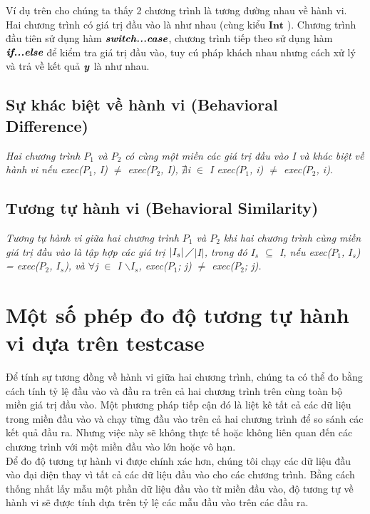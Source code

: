 Ví dụ trên cho chúng ta thấy 2 chương trình là tương đường nhau về hành vi. Hai chương trình có giá trị đầu vào là như nhau (cùng kiểu $\textbf{Int}$ ). Chương trình đầu tiên sử dụng hàm $\textit{\textbf{switch...case}}$, chương trình tiếp theo sử dụng hàm $\textit{\textbf{if...else}}$ để kiểm tra giá trị đầu vào, tuy cú pháp khách nhau nhưng cách xử lý và trả về kết quả $\textbf{\textit{y}}$ là như nhau. 
	
\subsection{Sự khác biệt về hành vi (Behavioral Difference)}
	\textit{Hai chương trình $P_{1}$ và $P_{2}$ có cùng một miền các giá trị đầu vào I và khác biệt về hành vi nếu exec($P_{1}$, I) $\neq$ exec($P_{2}$, I), $\nexists$i $\in$ I exec($P_{1}$, i) $\neq$ exec($P_{2}$, i)}.
	
\subsection{Tương tự hành vi (Behavioral Similarity)}
	\textit{Tương tự hành vi giữa hai chương trình $P_{1}$ và $P_{2}$ khi hai chương trình cùng miền giá trị đầu vào là tập hợp các giá trị $\left|I_{s}\right|\diagup$$\left|I\right|$, trong đó $I_{s}$ $\subseteq $ I, nếu exec($P_{1}$, $I_{s}$) = exec($P_{2}$, $I_{s}$), và $\forall$j $\in$ I $\backslash$$I_{s}$, exec($P_{1}$; j) $\neq$ exec($P_{2}$; j).}




\section{Một số phép đo độ tương tự hành vi dựa trên testcase}
Để tính sự tương đồng về hành vi giữa hai chương trình, chúng ta có thể đo bằng cách tính tỷ lệ đầu vào và đầu ra trên cả hai chương trình trên cùng toàn bộ miền giá trị đầu vào. Một phương pháp tiếp cận đó là liệt kê tất cả các dữ liệu trong miền đầu vào và chạy từng đầu vào trên cả hai chương trình để so sánh các kết quả đầu ra. Nhưng việc này sẽ không thực tế hoặc không liên quan đến các chương trình với một miền đầu vào lớn hoặc vô hạn. \\
	
Để đo độ tương tự hành vi được chính xác hơn, chúng tôi chạy các dữ liệu đầu vào đại diện thay vì tất cả các dữ liệu đầu vào cho các chương trình. Bằng cách thống nhất lấy mẫu một phần dữ liệu đầu vào từ miền đầu vào, độ tương tự về hành vi sẽ được tính dựa trên tỷ lệ các mẫu đầu vào trên các đầu ra. \\
	

